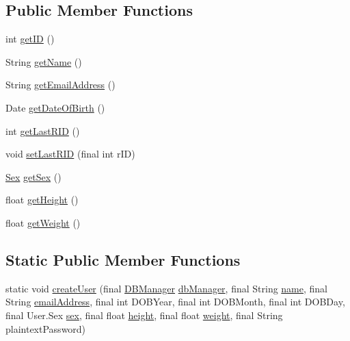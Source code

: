 \subsection*{Public Member Functions}
\begin{DoxyCompactItemize}
\item 
int \hyperlink{classcom_1_1activitytracker_1_1_user_a967ae64a7818e9e532ad6d361650d8e6}{get\+ID} ()
\item 
String \hyperlink{classcom_1_1activitytracker_1_1_user_a6b39e49a1e49279035fd61a667d14f64}{get\+Name} ()
\item 
String \hyperlink{classcom_1_1activitytracker_1_1_user_a79d69ca90216e0552ac4cae9778ea40d}{get\+Email\+Address} ()
\item 
Date \hyperlink{classcom_1_1activitytracker_1_1_user_a40da04454cea10bb5c6e6125a7a9cf64}{get\+Date\+Of\+Birth} ()
\item 
int \hyperlink{classcom_1_1activitytracker_1_1_user_a7040d0d696d79f9592eec6ac507de3c7}{get\+Last\+R\+ID} ()
\item 
void \hyperlink{classcom_1_1activitytracker_1_1_user_a9e91c79596a9a4dfda7b3453b61ff8d2}{set\+Last\+R\+ID} (final int r\+ID)
\item 
\hyperlink{enumcom_1_1activitytracker_1_1_user_1_1_sex}{Sex} \hyperlink{classcom_1_1activitytracker_1_1_user_ac184fdb794730df3fedf3b147283a5fd}{get\+Sex} ()
\item 
float \hyperlink{classcom_1_1activitytracker_1_1_user_a2a80ab659d02a07176b1793354131c00}{get\+Height} ()
\item 
float \hyperlink{classcom_1_1activitytracker_1_1_user_ad15d7b4f96adb6d1a14054bf3eb7e4e0}{get\+Weight} ()
\end{DoxyCompactItemize}
\subsection*{Static Public Member Functions}
\begin{DoxyCompactItemize}
\item 
static void \hyperlink{classcom_1_1activitytracker_1_1_user_ab9d405e0fc6916bbf4836ce6ab762bea}{create\+User} (final \hyperlink{classcom_1_1activitytracker_1_1_d_b_manager}{D\+B\+Manager} \hyperlink{classcom_1_1activitytracker_1_1_user_a8c8b36433447a235f2b4940b92e839c1}{db\+Manager}, final String \hyperlink{classcom_1_1activitytracker_1_1_user_a49bfb4c8ebf8b7a377df01b5f0b2d7bc}{name}, final String \hyperlink{classcom_1_1activitytracker_1_1_user_ac2fdb9a858d0295e52c5f8bc179e3137}{email\+Address}, final int D\+O\+B\+Year, final int D\+O\+B\+Month, final int D\+O\+B\+Day, final User.\+Sex \hyperlink{classcom_1_1activitytracker_1_1_user_adcbddd2e965af4e227f7cf0582a3e13d}{sex}, final float \hyperlink{classcom_1_1activitytracker_1_1_user_a83cdfe6f520a4e18e8710e8e11f8c3d6}{height}, final float \hyperlink{classcom_1_1activitytracker_1_1_user_a8a30c6c08983e513b462bcc035434c9e}{weight}, final String plaintext\+Password)
\end{DoxyCompactItemize}
